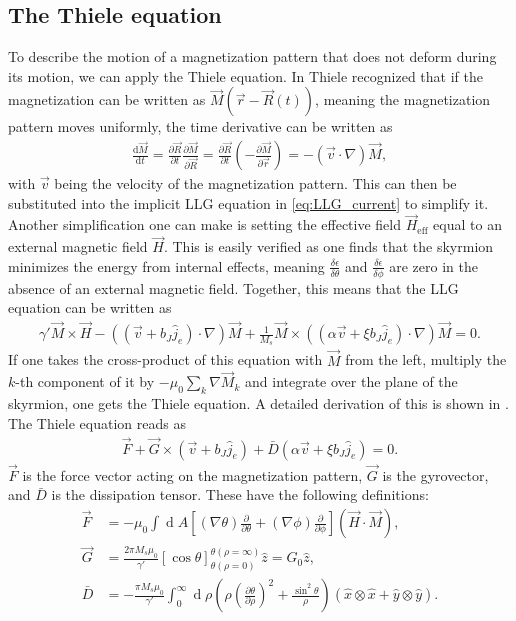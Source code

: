 \documentclass[1p]{elsarticle}		%
\renewcommand{\d}[1]{\ensuremath{\operatorname{d}\!{#1}}}
\numberwithin{equation}{section}
\begin{document}
\subsection{The Thiele equation}
To describe the motion of a magnetization pattern that does not deform during its motion, we can apply the Thiele equation. In \cite{Thiele1973} Thiele recognized that if the magnetization can be written as $\vec{M}(\vec{r}-\vec{R}(t))$, meaning the magnetization pattern moves uniformly, the time derivative can be written as
\begin{align}
\frac{\textrm{d} \vec{M}}{\textrm{d} t} = \frac{\partial \vec{R}}{\partial t}\frac{\partial \vec{M}}{\partial \vec{R}} = \frac{\partial \vec{R}}{\partial t} (-\frac{\partial \vec{M}}{\partial \vec{r}}) = -(\vec{v}\cdot\nabla)\vec{M},
\end{align}
with $\vec{v}$ being the velocity of the magnetization pattern. This can then be substituted into the implicit LLG equation in \eqref{eq:LLG_current} to simplify it. 
Another simplification one can make is setting the effective field $\vec{H}_{\text{eff}}$ equal to an external magnetic field $\vec{H}$. This is easily verified as one finds that the skyrmion minimizes the energy from internal effects, meaning $\frac{\delta\epsilon}{\delta\theta}$ and $\frac{\delta\epsilon}{\delta\phi}$ are zero in the absence of an external magnetic field. Together, this means that the LLG equation can be written as
\begin{align}
\gamma'\vec{M}\times\vec{H} - ((\vec{v}+b_J\hat{j}_e)\cdot\nabla)\vec{M} + \frac{1}{M_s}\vec{M}\times((\alpha\vec{v}+\xi b_J\hat{j}_e)\cdot\nabla)\vec{M} = 0.
\end{align}
If one takes the cross-product of this equation with $\vec{M}$ from the left, multiply the $k$-th component of it by $-\mu_0\sum_k\nabla\vec{M}_k$ and integrate over the plane of the skyrmion, one gets the Thiele equation. A detailed derivation of this is shown in \cite{krugerDissertation}. The Thiele equation reads as
\begin{align}
\label{eq:Thiele}
\vec{F} + \vec{G}\times(\vec{v}+b_J\hat{j}_e) + \bar{D}(\alpha\vec{v}+\xi b_J\hat{j}_e) = 0.
\end{align}
$\vec{F}$ is the force vector acting on the magnetization pattern, $\vec{G}$ is the gyrovector, and $\bar{D}$ is the dissipation tensor. These have the following definitions:
\begin{align}
\vec{F} &= -\mu_0 \int\d A \left[(\nabla\theta)\frac{\partial}{\partial \theta} + (\nabla\phi)\frac{\partial}{\partial \phi}\right] (\vec{H}\cdot\vec{M}),\label{eq:ThieleForce} \\
\vec{G} &= \frac{2\pi M_s\mu_0}{\gamma'}\left[\cos\theta\right]_{\theta(\rho = 0)}^{\theta(\rho=\infty)} \hat{z} = G_0 \hat{z}, \label{eq:ThieleGyro} \\
\bar{D} &= -\frac{\pi M_s\mu_0}{\gamma'}\int_0^{\infty}\d \rho (\rho (\frac{\partial \theta}{\partial \rho})^2+\frac{\sin^2\theta}{\rho})(\hat{x}\otimes\hat{x}+\hat{y}\otimes\hat{y}). \label{eq:ThieleDissipation}
\end{align}
\end{document}
